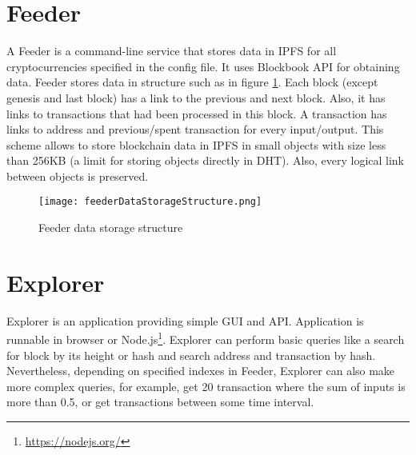 \section{Feeder}
A Feeder is a command-line service that stores data in IPFS for all cryptocurrencies specified in the config file. It uses Blockbook API for obtaining data. Feeder stores data in structure such as in figure \ref{feederDataStorageStructure}. Each block (except genesis and last block) has a link to the previous and next block. Also, it has links to transactions that had been processed in this block. A transaction has links to address and previous/spent transaction for every input/output. This scheme allows to store blockchain data in IPFS in small objects with size less than 256KB (a limit for storing objects directly in DHT). Also, every logical link between objects is preserved.


\begin{figure}[h]
    \centering
    \texttt{[image: feederDataStorageStructure.png]}
    \caption{Feeder data storage structure}
    \label{feederDataStorageStructure}
\end{figure}




\section{Explorer}
Explorer is an application providing simple GUI and API. Application is runnable in browser or Node.js\footnote{\url{https://nodejs.org/}}. Explorer can perform basic queries like a search for block by its height or hash and search address and transaction by hash. Nevertheless, depending on specified indexes in Feeder, Explorer can also make more complex queries, for example, get 20 transaction where the sum of inputs is more than 0.5, or get transactions between some time interval.



